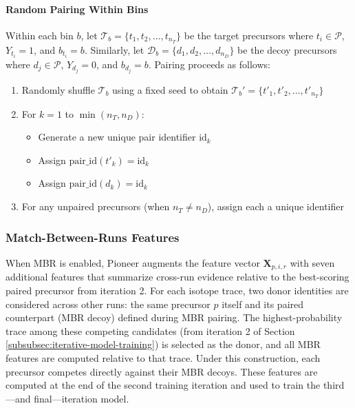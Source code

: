 \documentclass[pdflatex,sn-nature]{sn-jnl}
\begin{document}
\paragraph{Random Pairing Within Bins}\label{para:random-pairing-within-bins} Within each bin $b$, let $\mathcal{T}_b = \{t_1, t_2, \ldots, t_{n_T}\}$ be the target precursors where $t_i \in \mathcal{P}$, $Y_{t_i} = 1$, and $b_{t_i} = b$. Similarly, let $\mathcal{D}_b = \{d_1, d_2, \ldots, d_{n_D}\}$ be the decoy precursors where $d_j \in \mathcal{P}$, $Y_{d_j} = 0$, and $b_{d_j} = b$. Pairing proceeds as follows:

\begin{enumerate}
\item Randomly shuffle $\mathcal{T}_b$ using a fixed seed to obtain $\mathcal{T}_b' = \{t'_1, t'_2, \ldots, t'_{n_T}\}$
\item For $k = 1$ to $\min(n_T, n_D)$:
\begin{itemize}
    \item Generate a new unique pair identifier $\text{id}_k$
    \item Assign $\text{pair\_id}(t'_k) = \text{id}_k$
    \item Assign $\text{pair\_id}(d_k) = \text{id}_k$
\end{itemize}
\item For any unpaired precursors (when $n_T \neq n_D$), assign each a unique identifier
\end{enumerate}


\subsubsection{Match-Between-Runs Features}\label{sec:mbr_features}

When MBR is enabled, Pioneer augments the feature vector $\mathbf{X}_{p,i,r}$ with seven additional features that summarize cross-run evidence relative to the best-scoring paired precursor from iteration 2. For each isotope trace, two donor identities are considered across other runs: the same precursor $p$ itself and its paired counterpart (MBR decoy) defined during MBR pairing. The highest-probability trace among these competing candidates (from iteration 2 of Section \ref{subsubsec:iterative-model-training}) is selected as the donor, and all MBR features are computed relative to that trace. Under this construction, each precursor competes directly against their MBR decoys. These features are computed at the end of the second training iteration and used to train the third—and final—iteration model.
\end{document}
